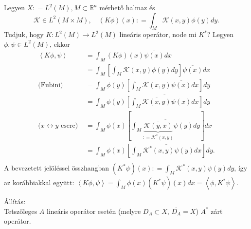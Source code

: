 \documentclass[12pt,a4paper]{scrartcl}
\newenvironment{allitas}{}{}
\begin{document}
Legyen \(X: = L^{2}\left( M \right),M \subset {\mathbb{R}}^{n}\) mérhető
halmaz és
\[\mathcal{K} \in L^{2}\left( {M \times M} \right),\quad\left( {K\phi} \right)\left( x \right): = {\int_{M}{\mathcal{K}\left( {x,y} \right)\phi\left( y \right)dy}}.\]
Tudjuk, hogy
\(\left. K:L^{2}\left( M \right)\rightarrow L^{2}\left( M \right) \right.\)
lineáris operátor, node mi \(K^{*}\)? Legyen
\(\phi,\psi \in L^{2}\left( M \right)\), ekkor \[\begin{aligned}
  \left\langle {K\phi ,\psi } \right\rangle  &  = \int_M {\left( {K\phi } \right)\left( x \right)\overline {\psi \left( x \right)} dx}  \\ 
   &  = \int_M {\left[ {\int_M {\mathcal{K}\left( {x,y} \right)\phi \left( y \right)dy} } \right]\overline {\psi \left( x \right)} dx}  \\ 
  {\text{(Fubini) }} &  = \int_M {\phi \left( y \right)\left[ {\int_M {\mathcal{K}\left( {x,y} \right)\overline {\psi \left( x \right)} dx} } \right]dy}  \\ 
   &  = \int_M {\phi \left( y \right)\overline {\left[ {\int_M {\overline {\mathcal{K}\left( {x,y} \right)} \psi \left( x \right)dx} } \right]} dy}  \\ 
  {\text{(}}x \leftrightarrow y{\text{ csere) }} &  = \int_M {\phi \left( x \right)\left[ {\overline {\int_M {\underbrace {\overline {\mathcal{K}\left( {y,x} \right)} }_{: = {\mathcal{K}^*}\left( {x,y} \right)}\psi \left( y \right)dy} } } \right]dx}  \\ 
   &  = \int_M {\phi \left( x \right)\left[ {\overline {\int_M {{\mathcal{K}^*}\left( {x,y} \right)\psi \left( y \right)dx} } } \right]dy} . \\ 
\end{aligned} \] A bevezetett jelöléssel összhangban
\(\left( {K^{*}\psi} \right)\left( x \right): = {\int_{M}{\mathcal{K}^{*}\left( {x,y} \right)\psi\left( y \right)dy}}\),
így az korábbiakkal együtt:
\(\left\langle {K\phi,\psi} \right\rangle = {\int_{M}{\phi\left( x \right)\overline{\left( {K^{*}\psi} \right)\left( x \right)}dx}} = \left\langle {\phi,K^{*}\psi} \right\rangle\).

\begin{allitas}

Állítás:\\
Tetszőleges \(A\) lineáris operátor esetén (melyre \(D_{A} \subset X\),
\(\overline{D_{A}} = X\)) \(A^{*}\) zárt operátor.

\end{allitas}
\end{document}
